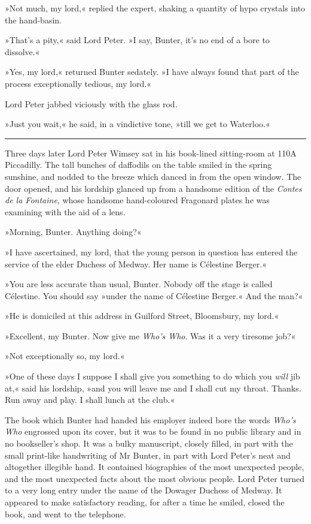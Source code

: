 »Not much, my lord,« replied the expert, shaking a quantity of hypo crystals into the hand-basin.

»That's a pity,« said Lord Peter. »I say, Bunter, it's no end of a bore to dissolve.«

»Yes, my lord,« returned Bunter sedately. »I have always found that part of the process exceptionally tedious, my lord.«

Lord Peter jabbed viciously with the glass rod.

»Just you wait,« he said, in a vindictive tone, »till we get to Waterloo.«

\noindent\hfil\rule{0.5\textwidth}{.4pt}\hfil 

Three days later Lord Peter Wimsey sat in his book-lined sitting-room at 110A Piccadilly. The tall bunches of daffodils on the table smiled in the spring sunshine, and nodded to the breeze which danced in from the open window. The door opened, and his lordship glanced up from a handsome edition of the \textit{Contes de la Fontaine}, whose handsome hand-coloured Fragonard plates he was examining with the aid of a lens.

»Morning, Bunter. Anything doing?«

»I have ascertained, my lord, that the young person in question has entered the service of the elder Duchess of Medway. Her name is Célestine Berger.«

»You are less accurate than usual, Bunter. Nobody off the stage is called Célestine. You should say »under the name of Célestine Berger.« And the man?«

»He is domiciled at this address in Guilford Street, Bloomsbury, my lord.«

»Excellent, my Bunter. Now give me \textit{Who's Who}. Was it a very tiresome job?«

»Not exceptionally so, my lord.«

»One of these days I suppose I shall give you something to do which you \textit{will} jib at,« said his lordship, »and you will leave me and I shall cut my throat. Thanks. Run away and play. I shall lunch at the club.«

The book which Bunter had handed his employer indeed bore the words \textit{Who's Who} engrossed upon its cover, but it was to be found in no public library and in no bookseller's shop. It was a bulky manuscript, closely filled, in part with the small print-like handwriting of Mr Bunter, in part with Lord Peter's neat and altogether illegible hand. It contained biographies of the most unexpected people, and the most unexpected facts about the most obvious people. Lord Peter turned to a very long entry under the name of the Dowager Duchess of Medway. It appeared to make satisfactory reading, for after a time he smiled, closed the book, and went to the telephone.

